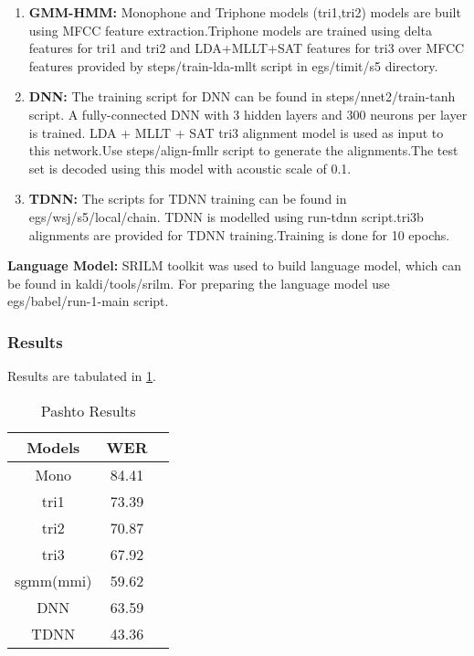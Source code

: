 \documentclass[12pt]{article}
\begin{document}
\begin{enumerate}
\item {\textbf{GMM-HMM:}} Monophone and Triphone models (tri1,tri2) models are built using MFCC feature extraction.Triphone models are trained using delta features for tri1 and tri2 and LDA+MLLT+SAT features for tri3 over MFCC features provided by steps/train-lda-mllt script in egs/timit/s5 directory.

\item {\textbf{DNN:}} The training script for DNN can be found in steps/nnet2/train-tanh script. A fully-connected DNN with 3 hidden layers and 300 neurons per layer is trained.  LDA + MLLT + SAT tri3 alignment model is used as input to this network.Use steps/align-fmllr script to generate the alignments.The test set is decoded using this model with acoustic scale of 0.1.


\item \textbf{TDNN:} The scripts for TDNN training can be found in egs/wsj/s5/local/chain. TDNN is modelled using run-tdnn script.tri3b alignments are provided for TDNN training.Training is done for 10 epochs.

\end{enumerate}

\textbf{Language Model:} SRILM toolkit was used to build language model, which can be found in kaldi/tools/srilm. For preparing the language model use egs/babel/run-1-main script.
\newpage
\subsubsection{Results}
Results are tabulated in \ref{tab:Pashto}.
\begin{table} [h!]
	\centering
		\caption{ Pashto Results }
\label{tab:Pashto}
\begin{tabular}{ | c || c | c | }
\hline Models & WER\\ 
\hline
\hline Mono & 84.41\\
\hline tri1 & 73.39\\
\hline tri2 & 70.87\\
\hline tri3 & 67.92\\
\hline sgmm(mmi) & 59.62\\
\hline DNN & 63.59\\
\hline TDNN & 43.36\\
\hline

\end{tabular}
\end{table}
\end{document}
